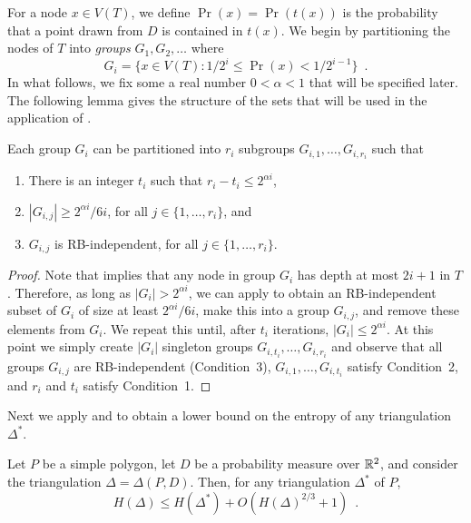 \documentclass[lotsofwhite]{patmorin}
\begin{document}
For a node $x\in V(T)$, we define $\Pr(x)=\Pr(t(x))$ is the
probability that a point drawn from $D$ is contained in $t(x)$.
We begin by partitioning the nodes of $T$ into
\emph{groups} $G_1,G_2,\ldots$ where
\[
	G_i = \{x\in V(T) : 1/2^{i} \le \Pr(x) < 1/2^{i-1} \} \enspace .
\]
In what follows, we fix some a real number $0< \alpha < 1$ that will be
specified later.   The following lemma gives the structure of the sets
that will be used in the application of .

\begin{lem}
Each group $G_i$ can be partitioned into $r_i$ subgroups
$G_{i,1},\ldots,G_{i,r_i}$ such that
\begin{enumerate}
\item There is an integer $t_i$ such that $r_i-t_i\le 2^{\alpha i}$,

\item $|G_{i,j}| \ge 2^{\alpha i} / 6i$, for all $j\in\{1,\ldots,r_i\}$, and 

\item $G_{i,j}$ is RB-independent, for all $j\in\{1,\ldots,r_i\}$.
\end{enumerate}
\end{lem}

\begin{proof}
Note that  implies that any node in group $G_{i}$ has
depth at most $2i+1$ in $T$.  Therefore, as long as 
$|G_i|>2^{\alpha i}$, we can apply  to obtain
an RB-independent subset of $G_i$ of size at least $2^{\alpha i}/6i$,
make this into a group $G_{i,j}$, and remove these elements from $G_i$.
We repeat this until, after $t_i$ iterations, $|G_i| \le 2^{\alpha
i}$.  At this point we simply create $|G_i|$ singleton groups
$G_{i,t_i},\ldots,G_{i,r_i}$ and observe that
all groups $G_{i,j}$ are RB-independent (Condition~3),
$G_{i,1},\ldots,G_{i,t_i}$ satisfy Condition~2, and $r_i$ and $t_i$ satisfy
Condition~1.
\end{proof}

Next we apply  and  to obtain a lower
bound on the entropy of any triangulation $\Delta^*$. 

\begin{lem}
Let $P$ be a simple polygon, let $D$ be a probability measure over
$\mathbb{R}^2$, and consider the triangulation $\Delta=\Delta(P,D)$.
Then, for any triangulation $\Delta^*$ of $P$,
\[
    H(\Delta) \le H(\Delta^*) + O(H(\Delta)^{2/3}+1) \enspace .
\]
\end{lem}
\end{document}
